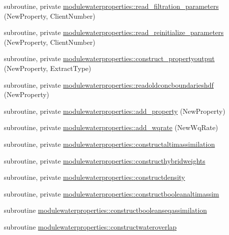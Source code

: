 \begin{DoxyCompactItemize}
\item 
subroutine, private \mbox{\hyperlink{namespacemodulewaterproperties_ace6684fcd5340a736f01034eee0565cd}{modulewaterproperties\+::read\+\_\+filtration\+\_\+parameters}} (New\+Property, Client\+Number)
\item 
subroutine, private \mbox{\hyperlink{namespacemodulewaterproperties_adb847af3f3968c2d9bf627677cb37d95}{modulewaterproperties\+::read\+\_\+reinitialize\+\_\+parameters}} (New\+Property, Client\+Number)
\item 
subroutine, private \mbox{\hyperlink{namespacemodulewaterproperties_a37e8798b8bd2e4c33eff80dd151d0d31}{modulewaterproperties\+::construct\+\_\+propertyoutput}} (New\+Property, Extract\+Type)
\item 
subroutine, private \mbox{\hyperlink{namespacemodulewaterproperties_ab37c7ef1af4bcefaf38220a0ce3fdf12}{modulewaterproperties\+::readoldconcboundarieshdf}} (New\+Property)
\item 
subroutine, private \mbox{\hyperlink{namespacemodulewaterproperties_ac86532460470d9c3746a9645ede24903}{modulewaterproperties\+::add\+\_\+property}} (New\+Property)
\item 
subroutine, private \mbox{\hyperlink{namespacemodulewaterproperties_ab70fa49456211c5f7697e02f7d5e81d2}{modulewaterproperties\+::add\+\_\+wqrate}} (New\+Wq\+Rate)
\item 
subroutine, private \mbox{\hyperlink{namespacemodulewaterproperties_ac1893e82a87294024a1db3f0c2a7a842}{modulewaterproperties\+::constructaltimassimilation}}
\item 
subroutine, private \mbox{\hyperlink{namespacemodulewaterproperties_a9167d6301bd0853ded33f93fb437a619}{modulewaterproperties\+::constructhybridweights}}
\item 
subroutine, private \mbox{\hyperlink{namespacemodulewaterproperties_aa61935dbc55b8114ffeef13972cd62b1}{modulewaterproperties\+::constructdensity}}
\item 
subroutine, private \mbox{\hyperlink{namespacemodulewaterproperties_a48d5c887c475fa7e3e29d35f55262ade}{modulewaterproperties\+::constructbooleanaltimassim}}
\item 
subroutine \mbox{\hyperlink{namespacemodulewaterproperties_aa5d8008c930a03a6746ab2ae44f44f14}{modulewaterproperties\+::constructbooleanseqassimilation}}
\item 
subroutine \mbox{\hyperlink{namespacemodulewaterproperties_a1c2eaa3c5cb93a51e2756820277cef75}{modulewaterproperties\+::constructwateroverlap}}
\item 

\end{DoxyCompactItemize}
